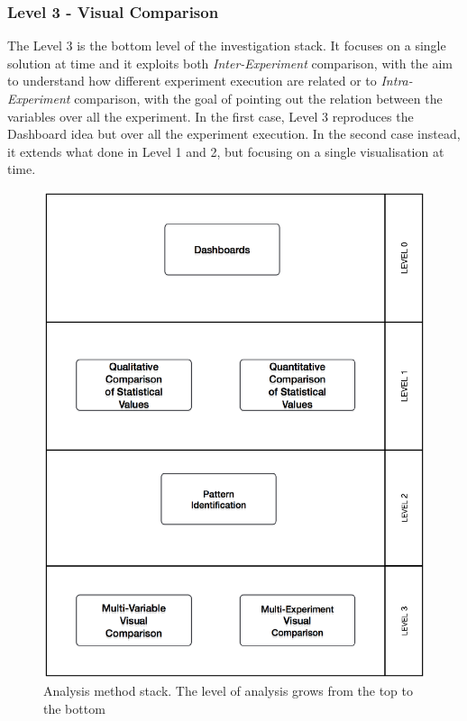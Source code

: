 \subsubsection{Level 3 - Visual Comparison}\label{sec:heaven-level3}

The Level 3 is the bottom level of the investigation stack. It focuses on a single solution at time and it exploits both \textit{Inter-Experiment} comparison, with the aim to understand how different experiment execution are related or to  \textit{Intra-Experiment} comparison, with the goal of pointing out the relation between the variables over all the experiment. In the first case, Level 3 reproduces the Dashboard idea but over all the experiment execution. In the second case instead, it extends what done in Level 1 and 2, but focusing on a single visualisation at time.

\begin{figure}[htb]
  \centering
	\includegraphics[width=\linewidth]{images/analysis-method}
	\caption{Analysis method stack. The level of analysis grows from the top to the bottom} 
  	\label{fig:analysis-method}
\end{figure}



